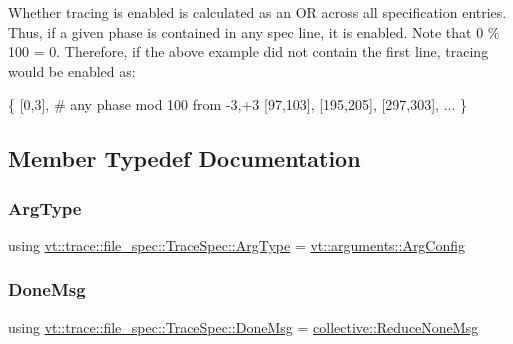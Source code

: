 Whether tracing is enabled is calculated as an OR across all specification entries. Thus, if a given phase is contained in any spec line, it is enabled. Note that 0 \% 100 = 0. Therefore, if the above example did not contain the first line, tracing would be enabled as\+:

\{ \mbox{[}0,3\mbox{]}, \# any phase mod 100 from -\/3,+3 \mbox{[}97,103\mbox{]}, \mbox{[}195,205\mbox{]}, \mbox{[}297,303\mbox{]}, ... \} 

\subsection{Member Typedef Documentation}
\mbox{\label{structvt_1_1trace_1_1file__spec_1_1_trace_spec_a273c85ad6266102f3cf20f72a739fd95}} 
\subsubsection{\texorpdfstring{Arg\+Type}{ArgType}}
{\footnotesize\ttfamily using \hyperlink{structvt_1_1trace_1_1file__spec_1_1_trace_spec_a273c85ad6266102f3cf20f72a739fd95}{vt\+::trace\+::file\+\_\+spec\+::\+Trace\+Spec\+::\+Arg\+Type} =  \hyperlink{structvt_1_1arguments_1_1_arg_config}{vt\+::arguments\+::\+Arg\+Config}}

\mbox{\label{structvt_1_1trace_1_1file__spec_1_1_trace_spec_a31fc42c00ddc382be9c198459793e1e9}} 
\subsubsection{\texorpdfstring{Done\+Msg}{DoneMsg}}
{\footnotesize\ttfamily using \hyperlink{structvt_1_1trace_1_1file__spec_1_1_trace_spec_a31fc42c00ddc382be9c198459793e1e9}{vt\+::trace\+::file\+\_\+spec\+::\+Trace\+Spec\+::\+Done\+Msg} =  \hyperlink{namespacevt_1_1collective_aa439a90f05078f2bcf918641c951946f}{collective\+::\+Reduce\+None\+Msg}}

